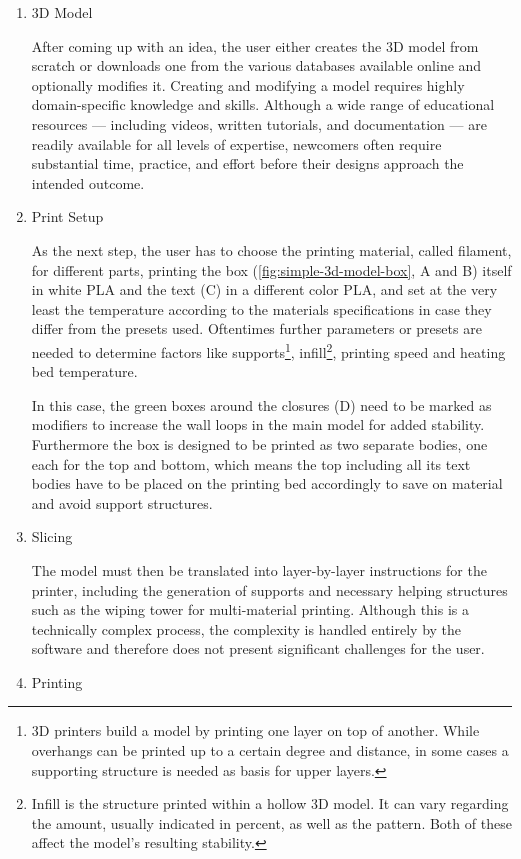 \begin{enumerate}
    \item 3D Model
    
    After coming up with an idea, the user either creates the 3D model from scratch or downloads one from the various databases available online and optionally modifies it. 
    Creating and modifying a model requires highly domain-specific knowledge and skills.
    Although a wide range of educational resources — including videos, written tutorials, and documentation — are readily available for all levels of expertise, newcomers often require substantial time, practice, and effort before their designs approach the intended outcome.

    \item Print Setup 
    
    As the next step, the user has to choose the printing material, called filament, for different parts, \eg printing the box (\ref{fig:simple-3d-model-box}, A and B) itself in white PLA and the text (C) in a different color PLA, and set at the very least the temperature according to the materials specifications in case they differ from the presets used. 
    Oftentimes further parameters or presets are needed to determine factors like supports\footnote{3D printers build a model by printing one layer on top of another. While overhangs can be printed up to a certain degree and distance, in some cases a supporting structure is needed as basis for upper layers.\cite[p.~152]{gibson_additive_2010}}, infill\footnote{Infill is the structure printed within a hollow 3D model. It can vary regarding the amount, usually indicated in percent, as well as the pattern. Both of these affect the model's resulting stability.\cite[p.~155]{gibson_additive_2010}}, printing speed and heating bed temperature. 

    In this case, the green boxes around the closures (D) need to be marked as modifiers to increase the wall loops in the main model for added stability. 
    Furthermore the box is designed to be printed as two separate bodies, one each for the top and bottom, which means the top including all its text bodies have to be placed on the printing bed accordingly to save on material and avoid support structures. 
    \item Slicing 
    
    The model must then be translated into layer-by-layer instructions for the printer, including the generation of supports and necessary helping structures such as the wiping tower for multi-material printing.
    Although this is a technically complex process, the complexity is handled entirely by the software and therefore does not present significant challenges for the user.
    \item Printing 
    

\end{enumerate}
